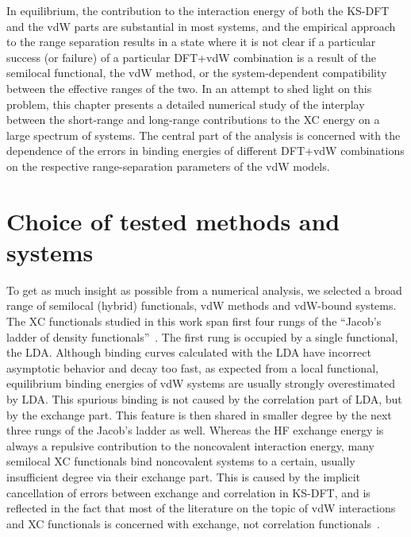 In equilibrium, the contribution to the interaction energy of both the KS-DFT and the vdW parts are substantial in most systems, and the empirical approach to the range separation results in a state where it is not clear if a particular success (or failure) of a particular DFT+vdW combination is a result of the semilocal functional, the vdW method, or the system-dependent compatibility between the effective ranges of the two.
In an attempt to shed light on this problem, this chapter presents a detailed numerical study of the interplay between the short-range and long-range contributions to the XC energy on a large spectrum of systems.
The central part of the analysis is concerned with the dependence of the errors in binding energies of different DFT+vdW combinations on the respective range-separation parameters of the vdW models.

\section{Choice of tested methods and systems}

To get as much insight as possible from a numerical analysis, we selected a broad range of semilocal (hybrid) functionals, vdW methods and vdW-bound systems.
The XC functionals studied in this work span first four rungs of the ``Jacob's ladder of density functionals''~\cite{PerdewACP01}.
The first rung is occupied by a single functional, the LDA\@.
Although binding curves calculated with the LDA have incorrect asymptotic behavior and decay too fast, as expected from a local functional, equilibrium binding energies of vdW systems are usually strongly overestimated by LDA\@.
This spurious binding is not caused by the correlation part of LDA, but by the exchange part.
This feature is then shared in smaller degree by the next three rungs of the Jacob's ladder as well.
Whereas the HF exchange energy is always a repulsive contribution to the noncovalent interaction energy, many semilocal XC functionals bind noncovalent systems to a certain, usually insufficient degree via their exchange part.
This is caused by the implicit cancellation of errors between exchange and correlation in KS-DFT, and is reflected in the fact that most of the literature on the topic of vdW interactions and XC functionals is concerned with exchange, not correlation functionals~\cite{ZhangJCP97,PengPRX16}.

